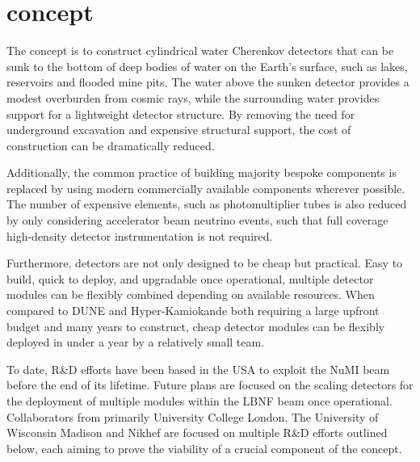 \section{\chips concept} %
\label{sec:chips_concept} %

The \chips concept is to construct cylindrical water Cherenkov detectors that can be sunk to the
bottom of deep bodies of water on the Earth's surface, such as lakes, reservoirs and flooded mine
pits. The water above the sunken detector provides a modest overburden from cosmic rays, while the
surrounding water provides support for a lightweight detector structure. By removing the need for
underground excavation and expensive structural support, the cost of construction can be
dramatically reduced.

Additionally, the common practice of building majority bespoke components is replaced by using
modern commercially available components wherever possible. The number of expensive elements, such
as photomultiplier tubes is also reduced by only considering accelerator beam neutrino events,
such that full coverage high-density detector instrumentation is not required.

Furthermore, \chips detectors are not only designed to be cheap but practical. Easy to build,
quick to deploy, and upgradable once operational, multiple detector modules can be flexibly
combined depending on available resources. When compared to DUNE and Hyper-Kamiokande both
requiring a large upfront budget and many years to construct, cheap \chips detector modules can be
flexibly deployed in under a year by a relatively small team.

To date, \chips R\&D efforts have been based in the USA to exploit the NuMI beam before the end of
its lifetime. Future plans are focused on the scaling \chips detectors for the deployment of
multiple modules within the LBNF beam once operational. Collaborators from primarily University
College London, The University of Wisconsin Madison and Nikhef are focused on multiple R\&D
efforts outlined below, each aiming to prove the viability of a crucial component of the \chips
concept.

